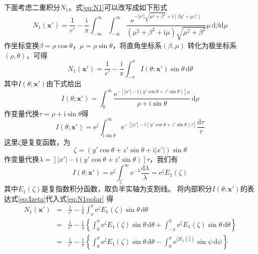下面考虑二重积分$N_1$。式\eqref{eq:N1}可以改写成如下形式
\begin{equation*}
  N_1(\mathbf{x'})=\frac{1}{r'}-\frac{\mathrm{i}}{\pi}\int_{-\infty}^{\infty}
  \int_{-\infty}^{\infty}\frac{\mathrm{e}^{-|x'|\sqrt{\mu^2+\beta^2}+\mathrm{i}(\beta y'+\mu z')}}{(\mu^2+\beta^2+\mathrm{i}\mu)\sqrt{\mu^2+\beta^2}}\mu\,
  \mathrm{d}\beta\mathrm{d}\mu
\end{equation*}
作坐标变换$\beta=\rho\cos\theta$，$\mu=\rho\sin\theta$，将直角坐标系$(\beta,\mu)$
转化为极坐标系$(\rho,\theta)$，可得
\begin{equation}
  N_1(\mathbf{x'})=\frac{1}{r'}-\frac{\mathrm{i}}{\pi}\int_{-\pi}^{\pi}
  I(\theta;\mathbf{x'})\sin\theta\,\mathrm{d}\theta
  \label{eq:N1polar}
\end{equation}
其中$I(\theta;\mathbf{x'})$由下式给出
\begin{equation*}
  I(\theta;\mathbf{x'})=\int_0^{\infty}\frac{\mathrm{e}^{-[|x'|-\mathrm{i}(y'\cos\theta+z'\sin\theta)]\rho}}{\rho+\mathrm{i}\sin\theta}\,\mathrm{d}\rho
\end{equation*}
作变量代换$\tau=\rho+\mathrm{i}\sin\theta$得
\begin{equation*}
  I(\theta;\mathbf{x'})=\mathrm{e}^\zeta\int_{\mathrm{i}\sin\theta}^{\infty}
  \mathrm{e}^{-[|x'|-\mathrm{i}(y'\cos\theta+z'\sin\theta)\tau]}\frac{\mathrm{d}\tau}{\tau}
\end{equation*}
这里$\zeta$是复变函数，为
\begin{equation}
  \zeta=(y'\cos\theta+z'\sin\theta+\mathrm{i}|x'|)\sin\theta
  \label{eq:zeta}
\end{equation}
作变量代换$\lambda=[|x'|-\mathrm{i}(y'\cos\theta+z'\sin\theta)]\tau$，我们有
\begin{equation}
  I(\theta;\mathbf{x'})=\mathrm{e}^\zeta\int_{\zeta}^{\infty}
  \mathrm{e}^{-\lambda}\frac{\mathrm{d}\lambda}{\lambda}=\mathrm{e}^\zeta E_1(\zeta)
  \label{eq:Izeta}
\end{equation}
其中$E_1(\zeta)$是复指数积分函数，取负半实轴为支割线。
将内部积分$I(\theta;\mathbf{x'})$的表达式\eqref{eq:Izeta}代入式\eqref{eq:N1polar}
得
\begin{eqnarray*}
  N_1(\mathbf{x'})&=&\frac{1}{r'}-\frac{\mathrm{i}}{\pi}\int_{\pi}^{\pi}
  \mathrm{e}^\zeta E_1(\zeta)\sin\theta\,\mathrm{d}\theta\\
  &=& \frac{1}{r'}-\frac{\mathrm{i}}{\pi}\left\{
  \int_0^\pi  
  \mathrm{e}^\zeta E_1(\zeta)\sin\theta\,\mathrm{d}\theta
  +\int_{-\pi}^0\mathrm{e}^\zeta E_1(\zeta)\sin\theta\,\mathrm{d}\theta
\right\}\\
&=&\frac{1}{r'}-\frac{\mathrm{i}}{\pi}\left\{
  \int_0^\pi  
  \mathrm{e}^\zeta E_1(\zeta)\sin\theta\,\mathrm{d}\theta
  -\int_0^\pi\mathrm{e}^{\bar{\zeta} E_1(\bar{\zeta})}\sin\psi\,\mathrm{d}\psi
\right\}
\end{eqnarray*}
